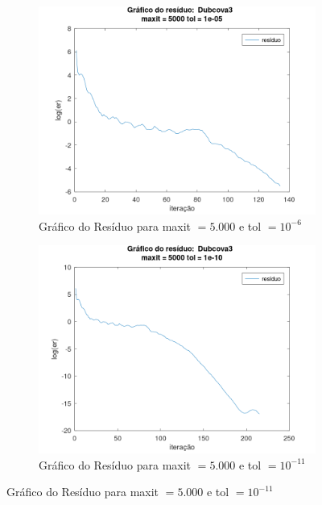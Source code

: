 \begin{figure}[H]
    \centering
    \begin{subfigure}[t]{0.4\linewidth}
         \centering
         \includegraphics[width=\textwidth]{image/Dubcova3_5000_-6.png}
         \caption{Gráfico do Resíduo para maxit $= 5.000$ e tol $=10^{-6}$}
         \label{fig:Dubcova3-5-6}
    \end{subfigure}
    \quad
    \begin{subfigure}[t]{0.4\linewidth}
         \centering
         \includegraphics[width=\textwidth]{image/Dubcova3_5000_-11.png}
         \caption{Gráfico do Resíduo para maxit $= 5.000$ e tol $=10^{-11}$}
         \label{fig:Dubcova3-5-11}
    \end{subfigure}

\end{figure}
